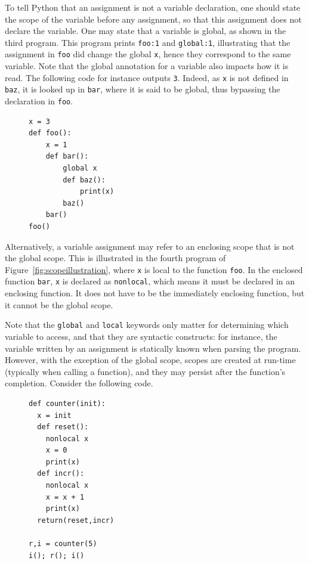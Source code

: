 \documentclass[submission,copyright,creativecommons]{eptcs}
\begin{document}
To tell Python that an assignment is not a variable declaration, one should
state the scope of the variable before any assignment, so that this
assignment does not declare the variable. One may state that a variable is
global, as shown in the third program. This program prints \texttt{foo:1} and
\texttt{global:1}, illustrating that the assignment in \texttt{foo} did change
the global \texttt{x}, hence they correspond to the same variable. Note that the global annotation for a variable also
impacts how it is read. The following code for instance outputs \texttt{3}.
Indeed, as \texttt{x} is not defined in \texttt{baz}, it is looked up in
\texttt{bar}, where it is said to be global, thus bypassing the declaration in \texttt{foo}.
\begin{figure}[h]
  \centering
  \begin{minipage}{0.25\linewidth}
    \begin{verbatim}
x = 3
def foo():
    x = 1
    def bar():
        global x
        def baz():
            print(x)
        baz()
    bar()
foo()
    \end{verbatim}
  \end{minipage}
\end{figure}

Alternatively, a variable assignment may refer to an enclosing scope that is not the global
scope. This is illustrated in the fourth program of Figure~\vref{fig:scopeillustration}, where \texttt{x} is local to
the function \texttt{foo}. In the enclosed function \texttt{bar}, \texttt{x} is
declared as \texttt{nonlocal}, which means it must be declared in an enclosing
function. It does not have to be the immediately enclosing function, but it
cannot be the global scope.

Note that the \texttt{global} and \texttt{local} keywords only matter for
determining which variable to access, and that they are syntactic constructs:
for instance, the variable written
by an assignment is statically known when parsing the program. However, with the
exception of the global scope, scopes are created at run-time (typically when
calling a function), and they may persist after the function's completion.
Consider the following code.
\begin{figure}[h]
  \centering
  \begin{minipage}{0.25\linewidth}
    \begin{verbatim}
def counter(init):
  x = init
  def reset():
    nonlocal x
    x = 0
    print(x)
  def incr():
    nonlocal x
    x = x + 1
    print(x)
  return(reset,incr)

r,i = counter(5)
i(); r(); i()
    \end{verbatim}
  \end{minipage}
\end{figure}
\end{document}

